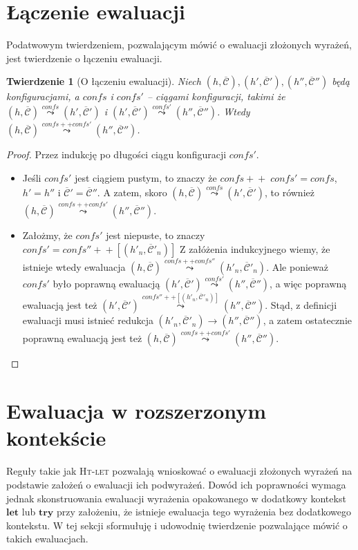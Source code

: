 \documentclass[]{pracamgr}
\renewcommand \| {\hspace{0.75em} | \hspace{0.75em} }
\renewcommand \[ {[\![}
\renewcommand \] {]\!]}
\newcommand \eval [1] {\overset{#1}{\leadsto}}
\newcommand \concat {+\!\!\!+}
\newtheorem{theorem}{Twierdzenie}
\theoremstyle{definition}
\newcommand{\jlet}{\mathbf{let}\xspace}
\newcommand{\jtry}{\mathbf{try}\xspace}
\newcommand{\ctxt}{\mathcal{C}\xspace}
\newcommand{\ctxts}{\overline{\ctxt}}
\begin{document}
\section{Łączenie ewaluacji}
Podatwowym twierdzeniem, pozwalającym mówić o ewaluacji złożonych wyrażeń, jest twierdzenie o łączeniu ewaluacji.
\begin{theorem}[O łączeniu ewaluacji]
\label{th:eval_join}
Niech $(h, \ctxts), (h', \ctxts'), (h'', \ctxts'')$ będą konfiguracjami, a $confs$ i $confs'$ -- ciągami konfiguracji,
takimi że $(h, \ctxts) \eval{confs} (h', \ctxts')$ i $(h', \ctxts') \eval{confs'} (h'', \ctxts'')$.
Wtedy $(h, \ctxts) \eval{confs ++ confs'} (h'', \ctxts'')$.
\end{theorem}
\begin{proof}
Przez indukcję po długości ciągu konfiguracji $confs'$.
\begin{itemize}
 \item Jeśli $confs'$ jest ciągiem pustym, to znaczy że $confs \concat\; confs' = confs$,
 $h' = h''$ i $\ctxts' = \ctxts''$. A zatem, skoro $(h, \ctxts) \eval{confs} (h', \ctxts')$,
 to również $(h, \ctxts) \eval{confs ++ confs'} (h'', \ctxts'')$.
 \item Założmy, że $confs'$ jest niepuste, to znaczy $confs' = confs'' \concat [ (h'_n, \ctxts'_n) ]$
 Z załóżenia indukcyjnego wiemy, że istnieje wtedy ewaluacja
 $(h, \ctxts) \eval{confs ++ confs''} (h'_n, \ctxts'_n)$.
 Ale ponieważ $confs'$ było poprawną ewaluacją $(h', \ctxts') \eval{confs'} (h'', \ctxts'')$, a więc
 poprawną ewaluacją jest też
 $(h', \ctxts') \eval{confs'' ++ [(h'_n, \ctxts'_n)]} (h'', \ctxts'')$.
 Stąd, z definicji ewaluacji musi istnieć redukcja $(h'_n, \ctxts'_n) \rightarrow (h'', \ctxts'')$,
 a zatem ostatecznie poprawną ewaluacją jest też $(h, \ctxts) \eval{confs ++ confs'} (h'', \ctxts'')$.
\end{itemize}

\end{proof}

\section{Ewaluacja w rozszerzonym kontekście}

Reguły takie jak \textsc{Ht-let} pozwalają wnioskować o ewaluacji złożonych wyrażeń
na podstawie założeń o ewaluacji ich podwyrażeń.
Dowód ich poprawności wymaga jednak skonstruowania ewaluacji wyrażenia opakowanego
w dodatkowy kontekst $\jlet$ lub $\jtry$ przy założeniu, że istnieje ewaluacja tego
wyrażenia bez dodatkowego kontekstu.
W tej sekcji sformułuję i udowodnię twierdzenie pozwalające mówić o takich ewaluacjach.
\end{document}
